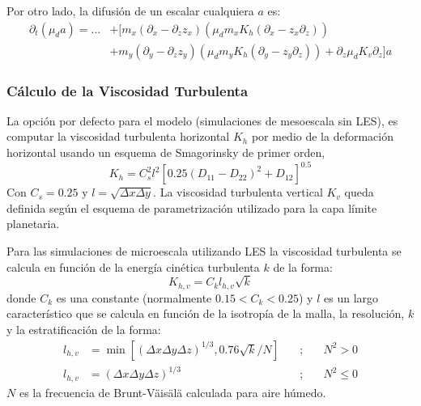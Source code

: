 Por otro lado, la difusión de un escalar cualquiera $a$ es:
\begin{equation}\begin{split}
\partial_t(\mu_d a) = ... &+ [m_x(\partial_x-\partial_z z_x)(\mu_d m_x K_h(\partial_x - z_x\partial_z)) \\
&+m_y(\partial_y-\partial_z z_y)(\mu_d m_y K_h(\partial_y-z_y\partial_z))+\partial_z\mu_dK_v\partial_z]a
\end{split}\end{equation}

\subsubsection{Cálculo de la Viscosidad Turbulenta}
La opción por defecto para el modelo (simulaciones de mesoescala sin LES), es computar la viscosidad turbulenta horizontal $K_h$ por medio de la deformación horizontal usando un esquema de Smagorinsky de primer orden,
\begin{equation}
K_h = C_s^2 l^2[0.25(D_{11}-D_{22})^2+D_{12}]^{0.5}
\end{equation}
Con $C_s=0.25$ y $l=\sqrt{\Delta x\Delta y}$. La viscosidad turbulenta vertical $K_v$ queda definida según el esquema de parametrización utilizado para la capa límite planetaria.

Para las simulaciones de microescala utilizando LES la viscosidad turbulenta se calcula en función de la energía cinética turbulenta $k$ de la forma:
\begin{equation}
K_{h,v}=C_k l_{h,v}\sqrt{k}
\end{equation}
donde $C_k$ es una constante (normalmente $0.15<C_k<0.25$) y $l$ es un largo característico que se calcula en función de la isotropía de la malla, la resolución, $k$ y la estratificación de la forma:
\begin{align}
	l_{h,v} &= \min[(\Delta x \Delta y \Delta z)^{1/3}, 0.76\sqrt{k}/N]\quad&;&\quad N^2>0\\
	l_{h,v} &= (\Delta x \Delta y \Delta z)^{1/3}\quad&;&\quad N^2\leq 0 
\end{align}
$N$ es la frecuencia de Brunt-Väisälä calculada para aire húmedo.

